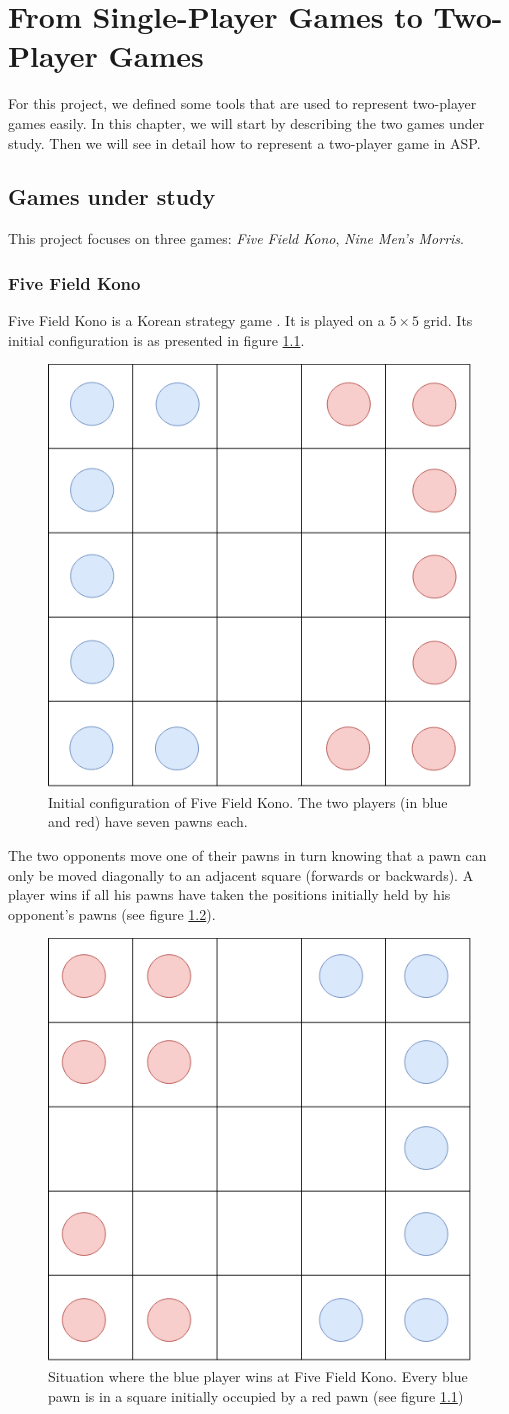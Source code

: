 
\chapter{From Single-Player Games to Two-Player Games}

For this project, we defined some tools that are used to represent two-player games easily. In this chapter, we will start by describing the two games under study. Then we will see in detail how to represent a two-player game in ASP.

\section{Games under study}

This project focuses on three games: \textit{Five Field Kono}, \textit{Nine Men's Morris}.

\bigskip

\subsection{Five Field Kono}

Five Field Kono is a Korean strategy game \citep{FFK_rules}. It is played on a $5\times 5$ grid. Its initial configuration is as presented in figure \ref{fig:FFK_initial}. 

\begin{figure}[h]
\centering
\includegraphics[width = 0.3\hsize]{figures/FFK_rules.png}
\caption{Initial configuration of Five Field Kono. The two players (in blue and red) have seven pawns each.}
\label{fig:FFK_initial}
\end{figure}

The two opponents move one of their pawns in turn knowing that a pawn can only be moved diagonally to an adjacent square (forwards or backwards). A player wins if all his pawns have taken the positions initially held by his opponent's pawns (see figure \ref{fig:FFK_ending}).

\begin{figure}[h]
\centering
\includegraphics[width = 0.3\hsize]{figures/FFK_ending.png}
\caption{Situation where the blue player wins at Five Field Kono. Every blue pawn is in a square initially occupied by a red pawn (see figure \ref{fig:FFK_initial})}
\label{fig:FFK_ending}
\end{figure}


